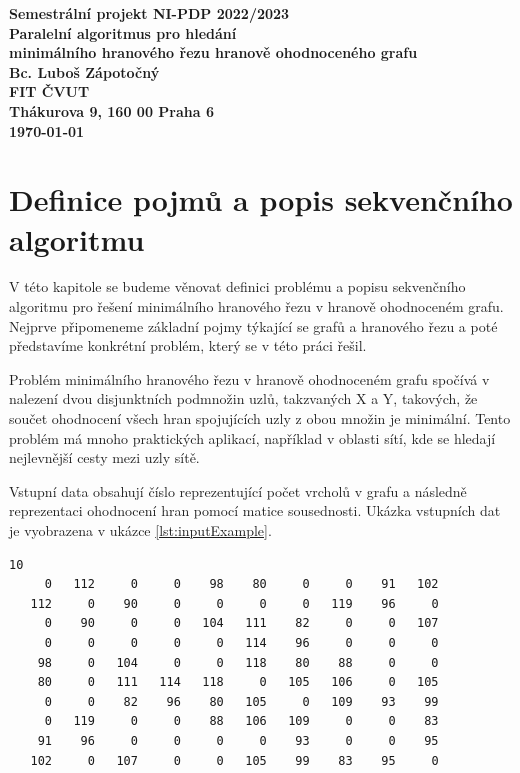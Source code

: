 \documentclass[epsf,epic,eepic,eepicemu]{article}\oddsidemargin=-5mm
\begin{document}
\begin{center}
\bf Semestrální projekt NI-PDP 2022/2023\\[5mm]
    Paralelní algoritmus pro hledání\\minimálního hranového řezu hranově ohodnoceného grafu\\[5mm] 
       Bc. Luboš Zápotočný\\[5mm]
FIT ČVUT\\Thákurova 9, 160 00 Praha 6\\[2mm]
\today
\end{center}

\section{Definice pojmů a popis sekvenčního algoritmu}

V této kapitole se budeme věnovat definici problému a popisu sekvenčního algoritmu pro řešení minimálního hranového řezu v hranově ohodnoceném grafu. Nejprve připomeneme základní pojmy týkající se grafů a hranového řezu a poté představíme konkrétní problém, který se v této práci řešil.

Problém minimálního hranového řezu v hranově ohodnoceném grafu spočívá v nalezení dvou disjunktních podmnožin uzlů, takzvaných X a Y, takových, že součet ohodnocení všech hran spojujících uzly z obou množin je minimální. Tento problém má mnoho praktických aplikací, například v oblasti sítí, kde se hledají nejlevnější cesty mezi uzly sítě.

Vstupní data obsahují číslo reprezentující počet vrcholů v grafu a následně reprezentaci ohodnocení hran pomocí matice sousednosti. Ukázka vstupních dat je vyobrazena v ukázce \ref{lst:inputExample}.

\begin{lstlisting}[label=lst:inputExample, caption={Vstupní data},language={}]
10
     0   112     0     0    98    80     0     0    91   102
   112     0    90     0     0     0     0   119    96     0
     0    90     0     0   104   111    82     0     0   107
     0     0     0     0     0   114    96     0     0     0
    98     0   104     0     0   118    80    88     0     0
    80     0   111   114   118     0   105   106     0   105
     0     0    82    96    80   105     0   109    93    99
     0   119     0     0    88   106   109     0     0    83
    91    96     0     0     0     0    93     0     0    95
   102     0   107     0     0   105    99    83    95     0
\end{lstlisting}
\end{document}
